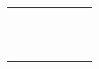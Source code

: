 \begin{center}
\begin{adjustwidth}{-2cm}{}
\begin{tabular}{|c c c c c c|}
             &  &  &  &  &  \\
             &  &  &  &  &  \\
             &  &  &  &  &  \\
             &  &  &  &  &  \\
             &  &  &  &  &  \\
             &  &  &  &  &  \\
             &  &  &  &  &  \\
             &  &  &  &  &  \\
             &  &  &  &  &  \\
             &  &  &  &  &  \\
            \hline
        \end{tabular}
    \end{adjustwidth}
\end{center}

